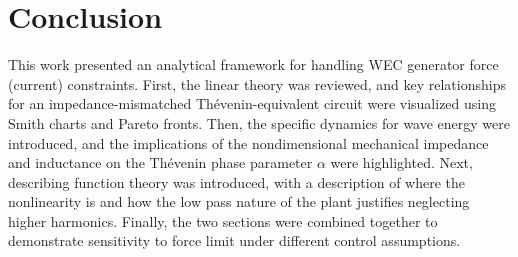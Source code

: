 \documentclass{ifacconf}
\begin{document}



\section{Conclusion}
This work presented an analytical framework for handling WEC generator force (current) constraints. First, the linear theory was reviewed, and key relationships for an impedance-mismatched Thévenin-equivalent circuit were visualized using Smith charts and Pareto fronts. Then, the specific dynamics for wave energy were introduced, and the implications of the nondimensional mechanical impedance and inductance on the Thévenin phase parameter $\alpha$ were highlighted. Next, describing function theory was introduced, with a description of where the nonlinearity is and how the low pass nature of the plant justifies neglecting higher harmonics. Finally, the two sections were combined together to demonstrate sensitivity to force limit under different control assumptions. 
\end{document}
